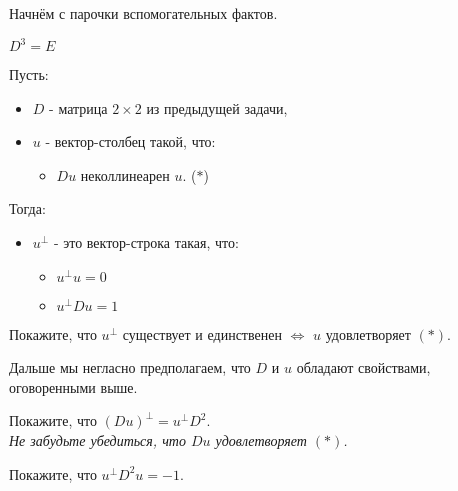 	Начнём с парочки вспомогательных фактов.
	
		{\item $D^3 = E$}

	\begin{definition}
		Пусть:
		\begin{itemize}
			\item $D$ - матрица $2 \times 2$ из предыдущей задачи,
			\item $u$ - вектор-столбец такой, что:
			\begin{itemize}
				\item $Du$ неколлинеарен $u$. \signed {} ($*$)
			\end{itemize}
		\end{itemize}
		Тогда:
		\begin{itemize}
			\item $u^\bot$ - это вектор-строка такая, что:
			\begin{itemize}
				\item $u^\bot u = 0$
				\item $u^\bot D u = 1$
			\end{itemize}
		\end{itemize}
	\end{definition}

	\begin{problem}
		Покажите, что $u^\bot$ существует и единственен $\iff$ $u$ удовлетворяет $(*)$.
	\end{problem}

	Дальше мы негласно предполагаем, что $D$ и $u$ обладают свойствами, оговоренными выше.

	\begin{problem}
		Покажите, что $(Du)^\bot = u^\bot D^2$. 
	\\ \textit {Не забудьте убедиться, что $Du$ удовлетворяет $(*)$.}
	\end{problem}

	\begin{problem}
		Покажите, что $u^\bot D^2 u = -1$.
	\end{problem}


	\begin{problem}
		
	\end{problem}
